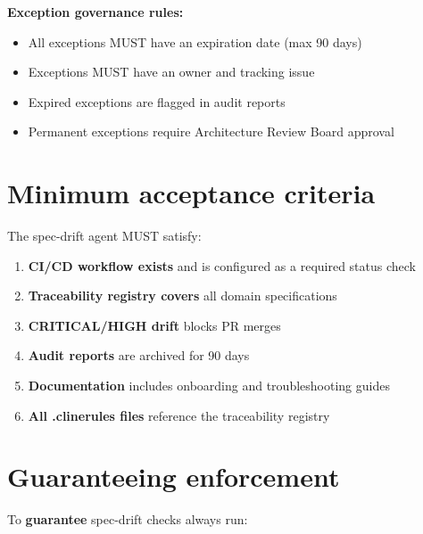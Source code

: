 \documentclass[11pt,a4paper,twoside]{report}
\begin{document}
\textbf{Exception governance rules:}
\begin{itemize}
\item All exceptions MUST have an expiration date (max 90 days)
\item Exceptions MUST have an owner and tracking issue
\item Expired exceptions are flagged in audit reports
\item Permanent exceptions require Architecture Review Board approval
\end{itemize}

\section{Minimum acceptance criteria}

The spec-drift agent MUST satisfy:

\begin{enumerate}
\item \textbf{CI/CD workflow exists} and is configured as a required status check
\item \textbf{Traceability registry covers} all domain specifications
\item \textbf{CRITICAL/HIGH drift} blocks PR merges
\item \textbf{Audit reports} are archived for 90 days
\item \textbf{Documentation} includes onboarding and troubleshooting guides
\item \textbf{All .clinerules files} reference the traceability registry
\end{enumerate}

\section{Guaranteeing enforcement}
\label{sec:guarantee}

To \textbf{guarantee} spec-drift checks always run:
\end{document}

